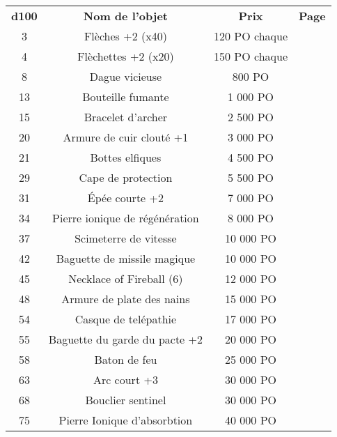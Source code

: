 \begin{table*} [tb]
    \setlength{\tabcolsep}{4pt}
    \center
\begin{tabular}{cccc}
  \bf d100 & \bf Nom de l'objet & \bf Prix & \bf Page \\
   \rowcolor{LightCyan}
   3 & Flèches +2 (x40)            & 120 PO chaque & \pageref{} \\
   4 & Flèchettes +2 (x20)         & 150 PO chaque & \pageref{} \\
   \rowcolor{LightCyan}            
   8 & Dague vicieuse              &        800 PO & \pageref{} \\
  13 & Bouteille fumante           &      1 000 PO & \pageref{} \\
   \rowcolor{LightCyan}
  15 & Bracelet d'archer           &      2 500 PO & \pageref{} \\
  20 & Armure de cuir clouté +1    &      3 000 PO & \pageref{} \\
   \rowcolor{LightCyan}
  21 & Bottes elfiques             &      4 500 PO & \pageref{} \\
  29 & Cape de protection          &      5 500 PO & \pageref{} \\
   \rowcolor{LightCyan}
  31 & Épée courte +2              &      7 000 PO & \pageref{} \\
  34 & Pierre ionique de régénération &   8 000 PO & \pageref{} \\
   \rowcolor{LightCyan}
  37 & Scimeterre de vitesse       &     10 000 PO & \pageref{} \\
  42 & Baguette de missile magique &     10 000 PO & \pageref{} \\
   \rowcolor{LightCyan}
  45 & Necklace of Fireball (6)    &     12 000 PO & \pageref{} \\
  48 & Armure de plate des nains   &     15 000 PO & \pageref{} \\
   \rowcolor{LightCyan}
  54 & Casque de telépathie        &     17 000 PO & \pageref{} \\
  55 & Baguette du garde du pacte +2 &   20 000 PO & \pageref{} \\
   \rowcolor{LightCyan}
  58 & Baton de feu                &     25 000 PO & \pageref{} \\
  63 & Arc court +3                &     30 000 PO & \pageref{} \\
   \rowcolor{LightCyan}
  68 & Bouclier sentinel           &     30 000 PO & \pageref{} \\
  75 & Pierre Ionique d'absorbtion &     40 000 PO & \pageref{} \\

\end{tabular}
\end{table*}
